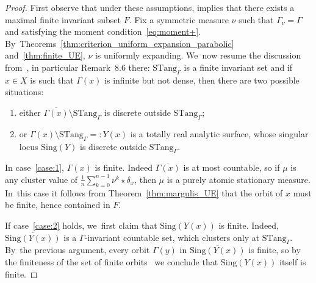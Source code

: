 \documentclass[JEP,XML,SOM,Unicode,published]{cedram}
\newcommand{\unsur}[1]{\frac{1}{#1}}
\newcommand{\Sing}{{\mathrm{Sing}}}
\newcommand{\STang}{{\mathrm{STang}}}
\theoremstyle{plain}
\theoremstyle{definition}
\begin{document}
\begin{proof}
First observe that under these assumptions, \cite[Th.\,C]{finite_orbits} implies
that there exists a maximal finite invariant subset $F$.
Fix a symmetric measure $\nu$ such that $\Gamma_\nu = \Gamma$ and satisfying the
moment condition~\eqref{eq:moment+}. By~Theorems~\ref{thm:criterion_uniform_expansion_parabolic} and~\ref{thm:finite_UE},
$\nu$ is uniformly expanding. We~now resume the discussion from~\cite[\S 8]{invariant}, in particular Remark~8.6 there: $\STang_\Gamma$ is a finite invariant set and if $x\in X$ is such that $\Gamma(x)$ is infinite
but not dense, then there are two possible situations:
\begin{enumerate}
\item\label{case:1} either $\overline{\Gamma(x)}\setminus \STang_\Gamma$ is discrete outside $\STang_\Gamma$;
\item\label{case:2} or $\overline{\Gamma(x)}\setminus \STang_\Gamma =: Y(x)$ is a totally real analytic surface, whose singular locus $\Sing(Y)$ is discrete outside $\STang_\Gamma$.
\end{enumerate}

In case~\eqref{case:1}, $\Gamma(x)$ is finite.
Indeed $\overline {\Gamma(x)}$ is at most countable,
so if $\mu$ is any cluster value of
$\unsur{n}\sum_{k=0}^{n-1} \nu^k\star\delta_x$, then $\mu$ is a purely atomic
stationary measure. In~this case it follows from Theorem~\ref{thm:margulis_UE} that
the orbit of $x$ must be finite, hence contained in $F$.

If case~\eqref{case:2} holds, we~first claim that $\Sing(Y(x))$ is finite.
Indeed, $\overline {\Sing(Y(x))}$ is a $\Gamma$-invariant countable set, which clusters only at
$\STang_\Gamma$. By~the previous argument, every orbit $\Gamma(y)$ in $\overline {\Sing(Y(x))}$ is finite, so by the
finiteness of the set of finite orbits~\cite[Th.\,C]{finite_orbits} we conclude that
$\Sing(Y(x))$ itself is finite.


\end{proof}
\end{document}

